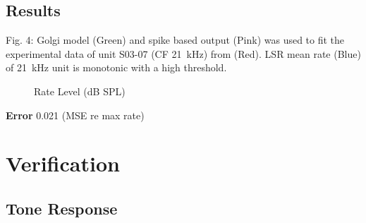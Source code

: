 \clearpage
\subsection{Results}
Fig. 4: Golgi model (Green) and spike based output (Pink) was used to
fit the experimental data of unit S03-07 (CF 21~kHz) from
\citep{GhoshalKim:1996} (Red).  LSR mean rate (Blue) of 21~kHz unit is
monotonic with a high threshold.



\begin{figure}[htb]
  \centering {}
  \caption{Rate Level (dB SPL)}
\end{figure}


\textbf{Error} 0.021 (MSE re max rate)



\section{Verification}
\subsection{Tone Response}

\begin{figure}[h]
  \centering{}
\end{figure}
\begin{figure}[h]
  \centering{}
\end{figure}
\begin{figure}[h]
  \centering{}
\end{figure}



\clearpage
